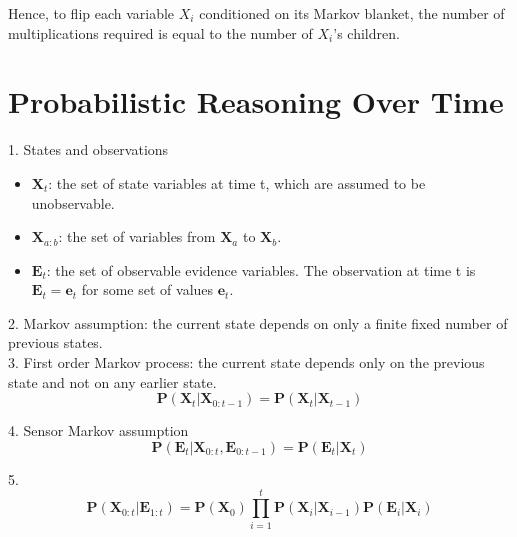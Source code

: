 \documentclass[12pt]{article}
\begin{document}
Hence, to flip each variable $X_i$ conditioned on its Markov blanket, the number of multiplications required is equal to the number of $X_i$'s children.

\section{Probabilistic Reasoning Over Time}

1. States and observations
\begin{itemize}
\item $\boldsymbol{X}_t$: the set of state variables at time t, which are assumed to be unobservable.
\item $\boldsymbol{X}_{a:b}$: the set of variables from $\boldsymbol{X}_a$ to $\boldsymbol{X}_b$.
\item $\boldsymbol{E}_t$: the set of observable evidence variables. The observation at time t is $\boldsymbol{E}_t = \boldsymbol{e}_t$ for some set of values $\boldsymbol{e}_t$.
\end{itemize}

2. Markov assumption: the current state depends on only a finite fixed number of previous states. \\

3. First order Markov process: the current state depends only on the previous state and not on any earlier state.
\begin{equation*}
\boldsymbol{P}(\boldsymbol{X}_t | \boldsymbol{X}_{0:t-1})
= \boldsymbol{P}(\boldsymbol{X}_t | \boldsymbol{X}_{t-1})
\end{equation*}

4. Sensor Markov assumption
\begin{equation*}
\boldsymbol{P}(\boldsymbol{E}_t | \boldsymbol{X}_{0:t}, \boldsymbol{E}_{0:t-1})
= \boldsymbol{P}(\boldsymbol{E}_t | \boldsymbol{X}_t)
\end{equation*}

5.
\begin{equation*}
\boldsymbol{P}(\boldsymbol{X}_{0:t} | \boldsymbol{E}_{1:t})
= \boldsymbol{P}(\boldsymbol{X}_0)
  \prod^t_{i=1} \boldsymbol{P}(\boldsymbol{X}_i | \boldsymbol{X}_{i-1})
  \boldsymbol{P}(\boldsymbol{E}_i | \boldsymbol{X}_i)
\end{equation*}
\end{document}

